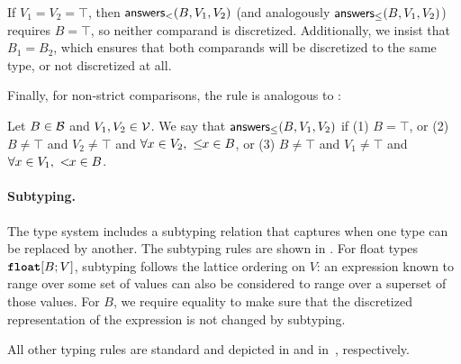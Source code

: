 If $V_1=V_2=\top$, then $\mathsf{answers}_<(B, V_1, V_2)$
(and analogously $\mathsf{answers}_{\leq}(B, V_1, V_2)$) requires $B=\top$, so neither comparand is discretized.
Additionally, we insist that $B_1 = B_2$, which ensures that both comparands will be discretized to the same type, or not discretized at all.



Finally, for non-strict comparisons, the rule is analogous to :
\begin{definition}
	\label{def:answers-less-equal}
	Let $B\in \mathcal{B}$ and $V_1, V_2 \in\mathcal{V}$.
	We say that \emph{$\mathsf{answers}_{\leq}(B, V_1, V_2)$} if (1) $B = \top$, or (2)  $B \neq \top$ and $V_2 \neq \top$ and $\forall x \in V_2,\ \leq\!\!{x} \in B$, or (3) 
	 $B \neq \top$ and $V_1 \neq \top$ and $\forall x \in V_1,\ <\!\!{x} \in B$.
\end{definition}



\paragraph{Subtyping.}
The type system includes a subtyping relation that captures when one type can be replaced by another. The subtyping rules are shown in . For float types $\textnormal{\ttfamily\bfseries float}[B;V]$, subtyping follows the lattice ordering on $V$: an expression known to range over some set of values can also be considered to range over a superset of those values. For $B$, we require equality to make sure that the discretized representation of the expression is not changed by subtyping.

All other typing rules are standard and depicted in  and in~\cite[\S~D]{Wu2026SliceExtended}, respectively.




